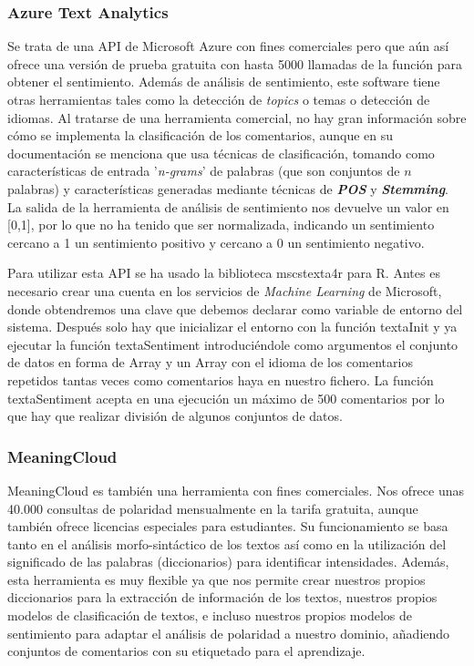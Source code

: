 \subsubsection{Azure Text Analytics}
Se trata de una API de Microsoft Azure con fines comerciales pero que aún así ofrece una versión de prueba gratuita con hasta 5000 llamadas de la función para obtener el sentimiento. Además de análisis de sentimiento, este software tiene otras herramientas tales como la detección de \textit{topics} o temas o detección de idiomas. Al tratarse de una herramienta comercial, no hay gran información sobre cómo se implementa la clasificación de los comentarios, aunque en su documentación \cite{azuredoc} se menciona que usa técnicas de clasificación, tomando como características de entrada '\textit{n-grams}' de palabras (que son conjuntos de $n$ palabras) y características generadas mediante técnicas de \textbf{\textit{POS}}  y \textbf{\textit{Stemming}}. La salida de la herramienta de análisis de sentimiento nos devuelve un valor en [0,1], por lo que no ha tenido que ser normalizada, indicando un sentimiento cercano a 1 un sentimiento positivo y cercano a 0 un sentimiento negativo.

Para utilizar esta API se ha usado la biblioteca mscstexta4r para R. Antes es necesario crear una cuenta en los servicios de \textit{Machine Learning} de Microsoft, donde obtendremos una clave que debemos declarar como variable de entorno del sistema. Después solo hay que inicializar el entorno con la función textaInit y ya ejecutar la función textaSentiment introduciéndole como argumentos el conjunto de datos en forma de Array y un Array con el idioma de los comentarios repetidos tantas veces como comentarios haya en nuestro fichero. La función textaSentiment acepta en una ejecución un máximo de 500 comentarios por lo que hay que realizar división de algunos conjuntos de datos.

\subsubsection{MeaningCloud}
MeaningCloud \cite{meaningclouddoc} es también una herramienta con fines comerciales. Nos ofrece unas 40.000 consultas de polaridad mensualmente en la tarifa gratuita, aunque también ofrece licencias especiales para estudiantes. Su funcionamiento se basa tanto en el análisis morfo-sintáctico de los textos así como en la utilización del significado de las palabras (diccionarios) para identificar intensidades. Además, esta herramienta es muy flexible ya que nos permite crear nuestros propios diccionarios para la extracción de información de los textos, nuestros propios modelos de clasificación de textos, e incluso nuestros propios modelos de sentimiento para adaptar el análisis de polaridad a nuestro dominio, añadiendo conjuntos de comentarios con su etiquetado para el aprendizaje.


